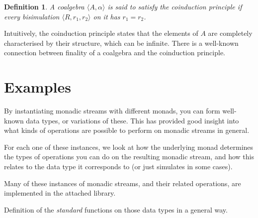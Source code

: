 \documentclass{article}
\newtheorem{definition}{Definition}
\begin{document}
\begin{definition}\label{def:coinduction}
A coalgebra $\langle A,\alpha\rangle$ is said to satisfy the {\em coinduction principle} if every bisimulation $\langle R,r_1,r_2\rangle$ on it has $r_1=r_2$.
\end{definition}

Intuitively, the coinduction principle states that the elements of $A$ are completely characterised by their structure, which can be infinite.
There is a well-known connection between finality of a coalgebra and the coinduction principle.











































\section{Examples}

By instantiating monadic streams with different monads, you can form well-known data types, or variations of these. This has provided good insight into what kinds of operations are possible to perform on monadic streams in general.

For each one of these instances, we look at how the underlying monad determines the types of operations you can do on the resulting monadic stream, and how this relates to the data type it corresponds to (or just simulates in some cases).

Many of these instances of monadic streams, and their related operations, are implemented in the attached library.

\begin{ccomment}
	Definition of the {\em standard} functions on those data types in a general way.
\end{ccomment}
\end{document}
